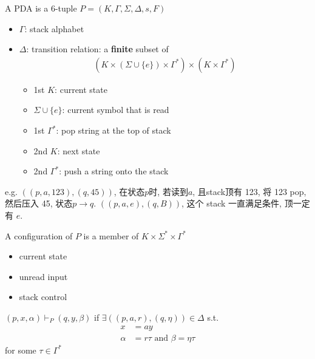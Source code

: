\begin{definition}
    A PDA is a 6-tuple $P=(K, \Gamma, \Sigma, \Delta, s, F)$
    \begin{itemize}
        \item $\Gamma$: stack alphabet
        \item $\Delta$: transition relation: a \textbf{finite} subset of 
        \begin{align*}
            (K\times (\Sigma\cup \{ e \})\times\Gamma^*)\times(K\times\Gamma^*)
        \end{align*}
        \begin{itemize}
            \item 1st $K$: current state
            \item $\Sigma\cup \{ e \}$: current symbol that is read
            \item 1st $\Gamma^*$: pop string at the top of stack
            \item 2nd $K$: next state
            \item 2nd $\Gamma^*$: push a string onto the stack
        \end{itemize}
    \end{itemize}
\end{definition}

e.g. $((p,a,123),(q,45))$, 在状态$p$时, 若读到$a$, 且stack顶有 123, 将 123 pop, 然后压入 45, 状态$p\to q$. $((p,a,e),(q,B))$, 这个 stack 一直满足条件, 顶一定有 $e$. 

\begin{definition}
    A configuration of $P$ is a member of $K\times \Sigma^*\times \Gamma^*$
    \begin{itemize}
        \item current state
        \item unread input
        \item stack control
    \end{itemize}
\end{definition}

\begin{definition}
    $(p,x,\alpha)\vdash_P (q,y,\beta)$ if $\exists ((p,a,r), (q,\eta ))\in \Delta$ s.t. 
    \begin{align*}
        x&=ay\\
        \alpha&=r\tau \text{ and }\beta = \eta \tau 
    \end{align*}
    for some $\tau \in \Gamma^*$
\end{definition}

